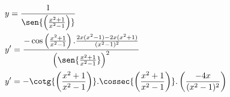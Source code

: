 \begin{ex}
\begin{align}
&y=\frac{1}{\sen{\left(\frac{x^2+1}{x^2-1}\right)}}\nonumber\\
&y'=\frac{-\cos{\left(\frac{x^2+1}{x^2-1}\right).\frac{2x(x^2-1)-2x(x^2+1)}{(x^2-1)^2}}}{\left(\sen{\frac{x^2+1}{x^2-1}}\right)^2}\nonumber\\
&y'=-\cotg{\left(\frac{x^2+1}{x^2-1}\right)}.\cossec{\left(\frac{x^2+1}{x^2-1}\right)}.\left(\frac{-4x}{(x^2-1)^2}\right)\nonumber
\end{align}
\end{ex}